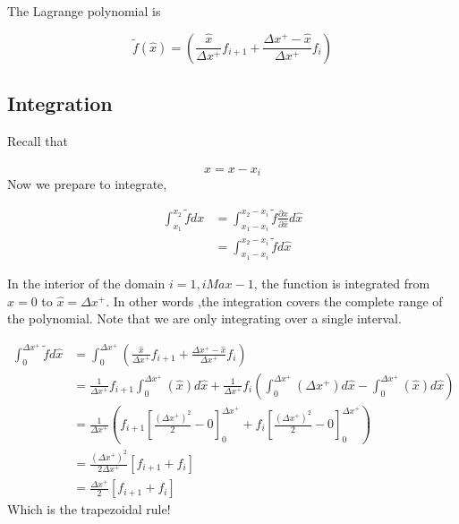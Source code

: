 \documentclass[12pt]{article}
\begin{document}
The Lagrange polynomial is

\begin{equation*}
    \widetilde{f}\left( \hat{x} \right) 
    =
    \left( 
        \frac{\hat{x}}{\Delta x^+}f_{i+1} +
        \frac{\Delta x^+ - \hat{x}}{\Delta x^+}f_i
    \right)
\end{equation*}

\subsection{Integration}

Recall that 

\[ \hat{x} = x - x_i\]
Now we prepare to integrate,

\begin{align*}
    \int_{x_1}^{x_2} \widetilde{f} dx &=
    \int_{x_1-x_i}^{x_2-x_i} \widetilde{f} \frac{\partial x}{\partial \hat{x}}d\hat{x}\\
                                      &=
                                      \int_{x_1-x_i}^{x_2 - x_i} \widetilde{f} d\hat{x}
\end{align*}

In the interior of the domain $i = 1, iMax - 1$, the function is integrated 
from $\hat{x} = 0$ to $\hat{x} = \Delta x^+$. In other words ,the integration 
covers the complete range of the polynomial. Note that we are only integrating
over a single interval.

\begin{align*}
    \int_0^{\Delta x^+} \widetilde{f} d\hat{x}&=
    \int_0^{\Delta x^+}
    \left( 
        \frac{\hat{x}}{\Delta x^+}f_{i+1} +
        \frac{\Delta x^+ - \hat{x}}{\Delta x^+}f_i
\right) \\ &= 
\frac{1}{\Delta x^+}f_{i+1}
\int_{0}^{\Delta x^+} 
\left(\hat{x}  \right) d\hat{x}
+
\frac{1}{\Delta x^+}
f_{i}
\left(
    \int_{0}^{\Delta x^+} 
    \left( \Delta x^+  \right) d\hat{x}
    -
    \int_{0}^{\Delta x^+} 
    \left( 
        \hat{x}
    \right) d\hat{x}
\right)\\
           &=\frac{1}{\Delta x^+}
           \left( 
               f_{i+1}\left[ 
                   \frac{\left( \Delta x^+ \right)^2}{
                   2} - 0
               \right]_0^{\Delta x^+}
               +
               f_i
               \left[ 
\frac{\left( \Delta x^+ \right)^2}{
                   2} - 0
               \right]_0^{\Delta x^+}
           \right) \\ &=
           \frac{\left( \Delta x^+ \right)^2}{2 \Delta x^+}
           \left[ f_{i+1} +f_i\right] \\
           &= 
           \frac{\Delta x^+}{2 }
           \left[ f_{i+1} +f_i\right] 
\end{align*}
Which is the trapezoidal rule!
\end{document}
